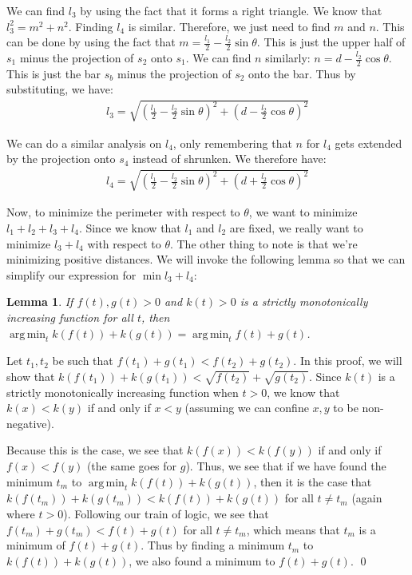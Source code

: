 \documentclass[12pt]{amsart}   %
\newtheorem{lemma}[theorem]{Lemma}
\DeclareMathOperator*{\argmin}{arg\,min}
\begin{document}
We can find $l_3$ by using the fact that it forms a right triangle. We know that $l_3^2 = m^2 + n^2$. Finding $l_4$ is similar. Therefore, we just need to find $m$ and $n$. This can be done by using the fact that $m = \frac{l_1}{2} - \frac{l_2}{2} \sin \theta$. This is just the upper half of $s_1$ minus the projection of $s_2$ onto $s_1$. We can find $n$ similarly: $n = d - \frac{l_2}{2} \cos \theta$. This is just the bar $s_b$ minus the projection of $s_2$ onto the bar. Thus by substituting, we have:
\begin{eqnarray}
  l_3 = \sqrt{ \left(\frac{l_1}{2} - \frac{l_2}{2} \sin \theta \right)^2 + \left( d - \frac{l_2}{2} \cos \theta \right)^2 }
\end{eqnarray}

We can do a similar analysis on $l_4$, only remembering that $n$ for $l_4$ gets extended by the projection onto $s_4$ instead of shrunken. We therefore have:
\begin{eqnarray}
  l_4 = \sqrt{ \left(\frac{l_1}{2} - \frac{l_2}{2} \sin \theta \right)^2 + \left( d + \frac{l_2}{2} \cos \theta \right)^2 }
\end{eqnarray}

Now, to minimize the perimeter with respect to $\theta$, we want to minimize $l_1 + l_2 + l_3 + l_4$. Since we know that $l_1$ and $l_2$ are fixed, we really want to minimize $l_3 + l_4$ with respect to $\theta$. The other thing to note is that we're minimizing positive distances. We will invoke the following lemma so that we can simplify our expression for $\min l_3 + l_4$:

\begin{lemma}
  If $f(t), g(t) > 0$ and $k(t) > 0$ is a strictly monotonically increasing function for all $t$, then $\argmin_t k(f(t)) + k(g(t)) = \argmin_t f(t) + g(t)$.
  \label{lemma:minsqrt}
\end{lemma}
\proof Let $t_1, t_2$ be such that $f(t_1) + g(t_1) < f(t_2) + g(t_2)$. In this proof, we will show that $k(f(t_1)) + k(g(t_1)) < \sqrt{f(t_2)} + \sqrt{g(t_2)}$. Since $k(t)$ is a strictly monotonically increasing function when $t > 0$, we know that $k(x) < k(y)$ if and only if $x < y$ (assuming we can confine $x, y$ to be non-negative).

Because this is the case, we see that $k(f(x)) < k(f(y))$ if and only if $f(x) < f(y)$ (the same goes for $g$). Thus, we see that if we have found the minimum $t_m$ to $\argmin_t k(f(t)) + k(g(t))$, then it is the case that $k(f(t_m)) + k(g(t_m)) < k(f(t)) + k(g(t))$ for all $t \neq t_m$ (again where $t > 0$). Following our train of logic, we see that $f(t_m) + g(t_m) < f(t) + g(t)$ for all $t \neq t_m$, which means that $t_m$ is a minimum of $f(t) + g(t)$. Thus by finding a minimum $t_m$ to $k(f(t)) + k(g(t))$, we also found a minimum to $f(t) + g(t)$. \qed
\end{document}
